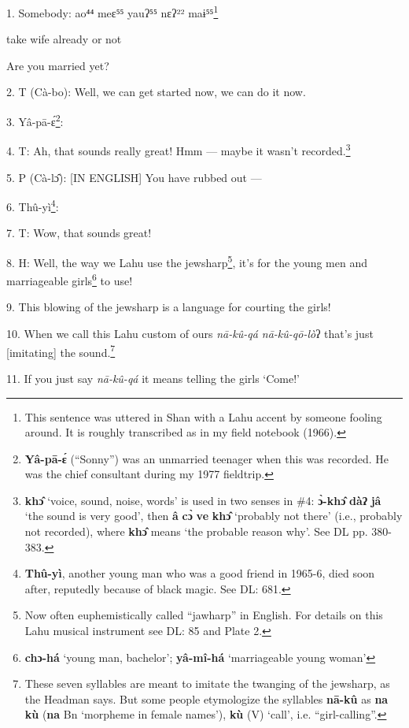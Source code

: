 \setcounter{footnote}{0}

1. Somebody: ao⁴⁴ meɛ⁵⁵ yauʔ⁵⁵ nɛʔ²² maɨ⁵⁵\footnote{This sentence was uttered in Shan with a Lahu accent by someone fooling around. It is roughly transcribed as in my field notebook (1966).}

take wife already or not

Are you married yet?

2. T (Cà-bo): Well, we can get started now, we can do it now.

3. Yâ-pā-ɛ́\footnote{\textbf{Yâ-pā-ɛ́} (``Sonny'') was an unmarried teenager when this was recorded. He was the chief consultant during my 1977 fieldtrip.}: 

4. T: Ah, that sounds really great! Hmm --- maybe it wasn't recorded.\footnote{\textbf{khɔ̂} `voice, sound, noise, words' is used in two senses in \#4: \textbf{ɔ̀-khɔ̂} \textbf{dàʔ} \textbf{jâ} `the sound is very good', then \textbf{â} \textbf{cɔ̀} \textbf{ve} \textbf{khɔ̂} `probably not there' (i.e., probably not recorded), where \textbf{khɔ̂} means `the probable reason why'. See DL pp. 380-383.}

5. P (Cà-lɔ̂): [IN ENGLISH] You have rubbed out ---

6. Thû-yì\footnote{\textbf{Thû-yì}, another young man who was a good friend in 1965-6, died soon after, reputedly because of black magic. See DL: 681.}: 

7. T: Wow, that sounds great!

8. H: Well, the way we Lahu use the jewsharp\footnote{Now often euphemistically called ``jawharp'' in English. For details on this Lahu musical instrument see DL: 85 and Plate 2.}, it's for the young men and marriageable
girls\footnote{\textbf{chɔ-há} `young man, bachelor'; \textbf{yâ-mî-há} `marriageable young woman'} to use!

9. This blowing of the jewsharp is a language for courting the girls!

10. When we call this Lahu custom of ours \textit{nā-kû-qá nā-kû-qō-lò}ʔ
that's just [imitating] the sound.\footnote{These seven syllables are meant to imitate the twanging of the jewsharp, as the Headman says. But some people etymologize the syllables \textbf{nā-kû} as \textbf{na} \textbf{kù} (\textbf{na} Bn `morpheme in female names'), \textbf{kù} (V) `call', i.e. ``girl-calling''.}

11. If you just say \textit{nā-kû-qá} it means telling the girls `Come!'

